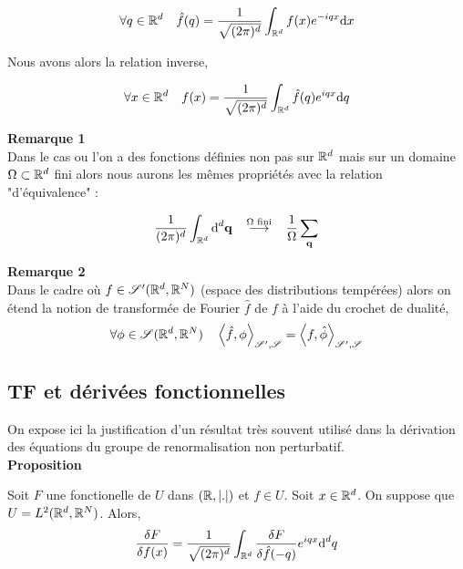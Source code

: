 \documentclass[10pt]{article}
\begin{document}
\begin{multicols}{2}
\begin{equation}
  \forall q \in \mathbb{R}^d \quad \hat{f}(q) = \frac{1}{\sqrt{(2\pi)^d}}\int_{\mathbb{R}^d} f(x) e^{-iqx}\text{d} x
\end{equation}

Nous avons alors la relation inverse,

\begin{equation}
  \forall x \in \mathbb{R}^d \quad f(x) = \frac{1}{\sqrt{(2\pi)^d}}\int_{\mathbb{R}^d} \hat{f}(q) e^{iqx}\text{d} q
\end{equation}

\textbf{Remarque 1} \\
Dans le cas ou l'on a des fonctions définies non pas sur $\mathbb{R}^d$ mais sur un domaine $\Omega \subset \mathbb{R}^d$ fini alors nous aurons les  mêmes propriétés avec la relation "d'équivalence" : 

\begin{equation}
  \frac{1}{(2\pi)^d} \int_{\mathbb{R}^d} \text{d}^d {\bf q} \overset{\text{$\Omega$ fini}}{\quad \longrightarrow \quad } \frac{1}{\Omega} \sum_{{\bf q}}
\end{equation}


\textbf{Remarque 2} \\
Dans le cadre où $f \in \mathscr{S}'(\mathbb{R}^d, \mathbb{R}^N)$ (espace des distributions tempérées) alors on étend la notion de transformée de Fourier $\hat{f}$ de $f$ à l'aide du crochet de dualité, 
\begin{equation}
  \forall \phi \in \mathscr{S}(\mathbb{R}^d, \mathbb{R}^N) \quad \left< \hat{f}, \phi \right>_{\mathscr{S}', \mathscr{S}} = \left< f, \hat{\phi} \right>_{\mathscr{S}', \mathscr{S}}
\end{equation}

\vspace*{11pt}







\vspace*{11pt}

\subsection{TF et dérivées fonctionnelles}


On expose ici la justification d'un résultat très souvent utilisé dans la dérivation des équations du groupe de renormalisation non perturbatif.\\ 

\textbf{Proposition}

Soit $F$ une fonctionelle de $U$ dans $(\mathbb{R},|.|)$ et $f \in U$.
Soit $x \in \mathbb{R}^d$. On suppose que $U = L^2(\mathbb{R}^d, \mathbb{R}^N)$. 
Alors, 
\begin{equation}
  \frac{\delta F}{\delta f(x)} = \frac{1}{\sqrt{(2\pi)^d}} \int_{\mathbb{R}^d} \frac{\delta F}{\delta \hat{f}(-q)} e^{iqx} \text{d}^d q
\end{equation} 



\end{multicols}
\end{document}
